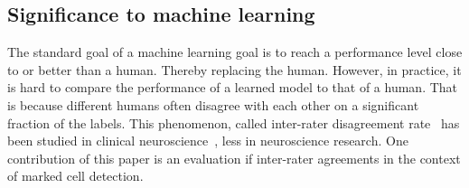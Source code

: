 \documentclass[11pt]{article}
\newcommand{\comment}[3]{{\color{#1} {\bf #2 :} #3}}
\newcommand{\yoav}[1]{\comment{purple}{Yoav}{#1}}
\begin{document}

\subsection{Significance to machine learning}
The standard goal of a machine learning goal is to reach a performance
level close to or better than a human. Thereby replacing the human.
However, in practice, it is hard to compare the performance of a
learned model to that of a human. That is because different humans
often disagree with each other on a significant fraction of the
labels. This phenomenon, called inter-rater disagreement
rate~\cite{general} has been studied in clinical neuroscience~\cite{},
less in neuroscience research. One contribution of this paper is an
evaluation if inter-rater agreements in the context of marked cell
detection.
\end{document}
